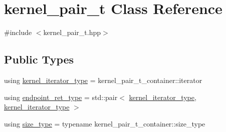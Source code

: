 \hypertarget{classkernel__pair__t}{}\section{kernel\+\_\+pair\+\_\+t Class Reference}
\label{classkernel__pair__t}


{\ttfamily \#include $<$kernel\+\_\+pair\+\_\+t.\+hpp$>$}

\subsection*{Public Types}
\begin{DoxyCompactItemize}
\item 
using \hyperlink{classkernel__pair__t_acd6ec478738b84ddad1c863b7c8b55c1}{kernel\+\_\+iterator\+\_\+type} = kernel\+\_\+pair\+\_\+t\+\_\+container\+::iterator
\item 
using \hyperlink{classkernel__pair__t_abc3c7ff96f4f00f4e31c56fb2b7da728}{endpoint\+\_\+ret\+\_\+type} = std\+::pair$<$ \hyperlink{classkernel__pair__t_acd6ec478738b84ddad1c863b7c8b55c1}{kernel\+\_\+iterator\+\_\+type}, \hyperlink{classkernel__pair__t_acd6ec478738b84ddad1c863b7c8b55c1}{kernel\+\_\+iterator\+\_\+type} $>$
\item 
using \hyperlink{classkernel__pair__t_aec4bb36f70893ab1bf0a912e8c3aca2a}{size\+\_\+type} = typename kernel\+\_\+pair\+\_\+t\+\_\+container\+::size\+\_\+type
\end{DoxyCompactItemize}
